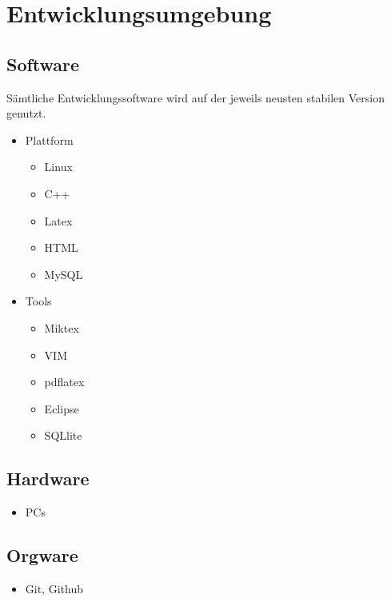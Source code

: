 
\section{Entwicklungsumgebung}


\subsection{Software}

Sämtliche Entwicklungssoftware wird auf der jeweils neusten stabilen Version genutzt.

\begin{itemize}
  \item Plattform
    \begin{itemize}
		\item Linux
        \item C++
        \item Latex
        \item HTML
        \item MySQL
    \end{itemize}
  \item Tools
    \begin{itemize}
  		\item Miktex
        \item VIM
        \item pdflatex
        \item Eclipse
        \item SQLlite
    \end{itemize}

\end{itemize}

\subsection{Hardware}

\begin{itemize}
	\item PCs
\end{itemize}

\subsection{Orgware}

\begin{itemize}
  	\item Git, Github
\end{itemize}
